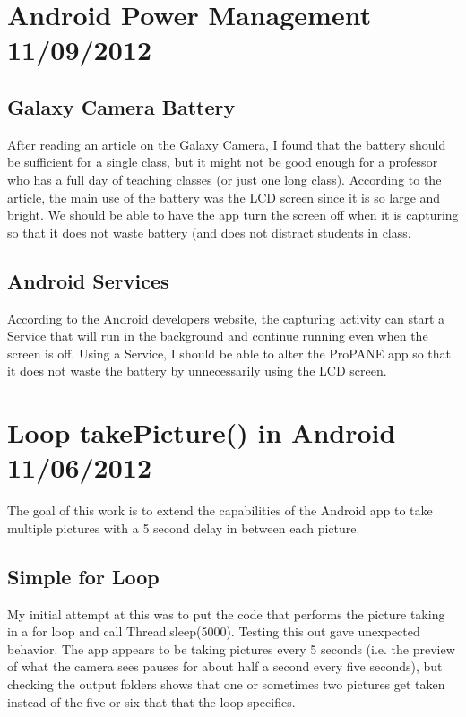 \documentclass[]{article}
\begin{document}
	\section{Android Power Management 11/09/2012}
		
		\subsection{Galaxy Camera Battery}
			After reading an article on the Galaxy Camera, I found that the battery should be sufficient for a single class, but it might not be good enough for a professor who has a full day of teaching classes (or just one long class). According to the article, the main use of the battery was the LCD screen since it is so large and bright. We should be able to have the app turn the screen off when it is capturing so that it does not waste battery (and does not distract students in class. 
			
		\subsection{Android Services}
			According to the Android developers website, the capturing activity can start a Service that will run in the background and continue running even when the screen is off. Using a Service, I should be able to alter the ProPANE app so that it does not waste the battery by unnecessarily using the LCD screen. 
	
	\section{Loop takePicture() in Android 11/06/2012}
		The goal of this work is to extend the capabilities of the Android app to take multiple pictures with a 5 second delay in between each picture.
		
		\subsection{Simple for Loop}
			My initial attempt at this was to put the code that performs the picture taking in a for loop and call Thread.sleep(5000). Testing this out gave unexpected behavior. The app appears to be taking pictures every 5 seconds (i.e. the preview of what the camera sees pauses for about half a second every five seconds), but checking the output folders shows that one or sometimes two pictures get taken instead of the five or six that that the loop specifies. 
			
\end{document}
